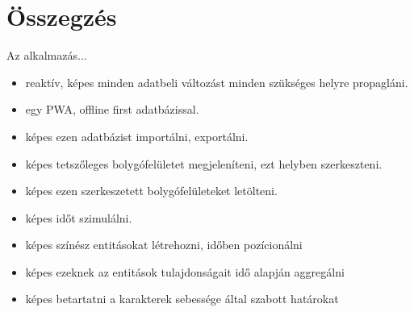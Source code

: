 \chapter{Összegzés}
\label{ch:sum}

Az alkalmazás$\dots$

\begin{itemize}
	\item reaktív, képes minden adatbeli változást minden szükséges helyre propagláni.
	\item egy PWA, offline first adatbázissal.
	\item képes ezen adatbázist importálni, exportálni.
	\item képes tetszőleges bolygófelületet megjeleníteni, ezt helyben szerkeszteni.
	\item képes ezen szerkeszetett bolygófelületeket letölteni.
	\item képes időt szimulálni.
	\item képes színész entitásokat létrehozni, időben pozícionálni
	\item képes ezeknek az entitások tulajdonságait idő alapján aggregálni
	\item képes betartatni a karakterek sebessége által szabott határokat

\end{itemize}
